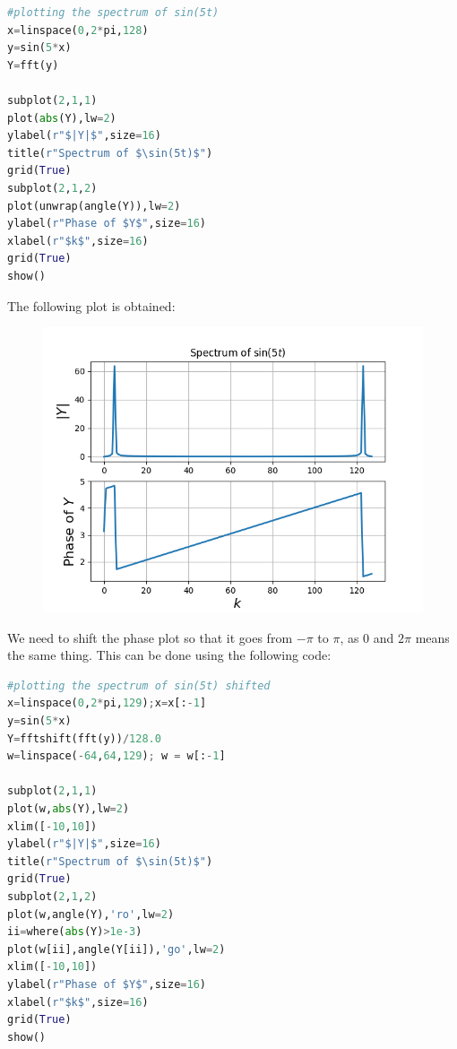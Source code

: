 \documentclass[11pt, a4paper]{article}
\begin{document}
\begin{lstlisting}[language = Python]
#plotting the spectrum of sin(5t)
x=linspace(0,2*pi,128)
y=sin(5*x)
Y=fft(y)

subplot(2,1,1)
plot(abs(Y),lw=2)
ylabel(r"$|Y|$",size=16)
title(r"Spectrum of $\sin(5t)$")
grid(True)
subplot(2,1,2)
plot(unwrap(angle(Y)),lw=2)
ylabel(r"Phase of $Y$",size=16)
xlabel(r"$k$",size=16)
grid(True)
show()
\end{lstlisting}

The following plot is obtained:
\begin{figure}[H]
     \centering
     \includegraphics[scale=0.8]{Figure_1.png}
\end{figure}

We need to shift the phase plot so that it goes from $-\pi$ to $\pi$,  as 0 and $2\pi$ means the same thing. This can be done using the following code:

\begin{lstlisting}[language = Python]
#plotting the spectrum of sin(5t) shifted
x=linspace(0,2*pi,129);x=x[:-1]
y=sin(5*x)
Y=fftshift(fft(y))/128.0
w=linspace(-64,64,129); w = w[:-1]

subplot(2,1,1)
plot(w,abs(Y),lw=2)
xlim([-10,10])
ylabel(r"$|Y|$",size=16)
title(r"Spectrum of $\sin(5t)$")
grid(True)
subplot(2,1,2)
plot(w,angle(Y),'ro',lw=2)
ii=where(abs(Y)>1e-3)
plot(w[ii],angle(Y[ii]),'go',lw=2)
xlim([-10,10])
ylabel(r"Phase of $Y$",size=16)
xlabel(r"$k$",size=16)
grid(True)
show()
\end{lstlisting}
\end{document}

